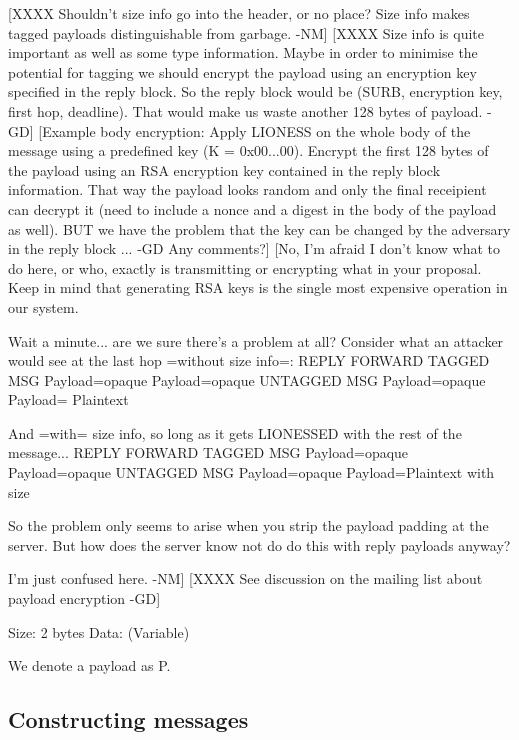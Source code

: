   [XXXX Shouldn't size info go into the header, or no place?  Size
     info makes tagged payloads distinguishable from garbage. -NM]
  [XXXX Size info is quite important as well as some type information.
     Maybe in order to minimise the potential for tagging we should
     encrypt the payload using an encryption key specified in the
     reply block. So the reply block would be (SURB, encryption key,
     first hop, deadline). That would make us waste another 128 bytes
     of payload. -GD]
  [Example body encryption: Apply LIONESS on the whole body of the
     message using a predefined key (K = 0x00...00). Encrypt the first
     128 bytes of the payload using an RSA encryption key contained in
     the reply block information. That way the payload looks random
     and only the final receipient can decrypt it (need to include a
     nonce and a digest in the body of the payload as well). BUT we
     have the problem that the key can be changed by the adversary in
     the reply block ... -GD Any comments?]
  [No, I'm afraid I don't know what to do here, or who, exactly is
     transmitting or encrypting what in your proposal.  Keep in mind 
     that generating RSA keys is the single most expensive operation
     in our system.
 
     Wait a minute... are we sure there's a problem at all?  Consider
     what an attacker would see at the last hop =without size info=:
                            REPLY          FORWARD 
          TAGGED MSG     Payload=opaque  Payload=opaque 
          UNTAGGED MSG   Payload=opaque  Payload= Plaintext 

     And =with= size info, so long as it gets LIONESSED with the
     rest of the message...
                            REPLY          FORWARD 
          TAGGED MSG     Payload=opaque  Payload=opaque 
          UNTAGGED MSG   Payload=opaque  Payload=Plaintext with size

     So the problem only seems to arise when you strip the payload
     padding at the server.  But how does the server know not do
     do this with reply payloads anyway?

     I'm just confused here. -NM]
[XXXX See discussion on the mailing list about payload encryption -GD]

Size:   2 bytes
Data:   (Variable)

We denote a payload as P.

\subsection{Constructing messages}

